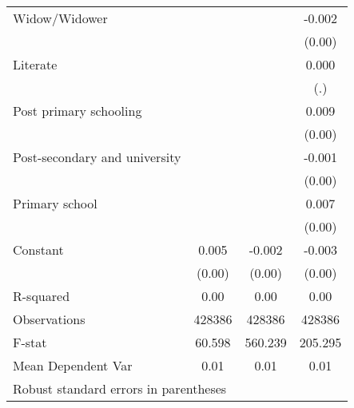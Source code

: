 {\begin{tabular}{l*{3}{c}}
Widow/Widower       &                     &                     &      -0.002         \\
                    &                     &                     &      (0.00)         \\
Literate            &                     &                     &       0.000         \\
                    &                     &                     &         (.)         \\
Post primary schooling&                     &                     &       0.009\sym{***}\\
                    &                     &                     &      (0.00)         \\
Post-secondary and university&                     &                     &      -0.001         \\
                    &                     &                     &      (0.00)         \\
Primary school      &                     &                     &       0.007\sym{***}\\
                    &                     &                     &      (0.00)         \\
Constant            &       0.005\sym{***}&      -0.002         &      -0.003         \\
                    &      (0.00)         &      (0.00)         &      (0.00)         \\
\hline
R-squared           &        0.00         &        0.00         &        0.00         \\
Observations        &      428386         &      428386         &      428386         \\
F-stat              &      60.598         &     560.239         &     205.295         \\
Mean Dependent Var  &        0.01         &        0.01         &        0.01         \\
\hline\hline
\multicolumn{4}{l}{\footnotesize Robust standard errors in parentheses}\\
\end{tabular}
}
